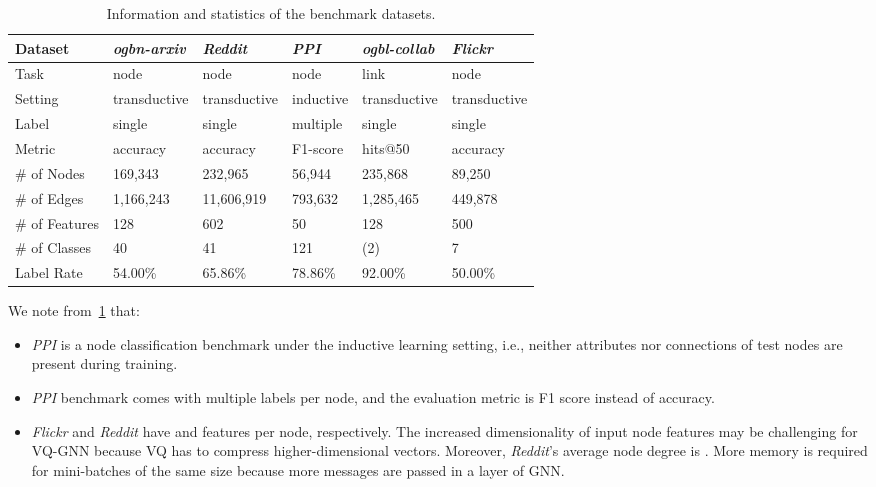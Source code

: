 \documentclass{article}
\begin{document}
\begin{table}[ht]
\centering
\caption{\label{tab:dataset-stats}Information and statistics of the benchmark datasets.}
\begin{tabular}{llllll} \toprule
Dataset        & \textit{ogbn-arxiv}   & \textit{Reddit}       & \textit{PPI}       & \textit{ogbl-collab}  & \textit{Flickr}       \\ \midrule
Task           & node         & node         & node      & link         & node         \\
Setting        & transductive & transductive & inductive & transductive & transductive \\
Label          & single       & single       & multiple  & single       & single       \\
Metric         & accuracy     & accuracy     & F1-score  & hits@50      & accuracy       \\
\# of Nodes    & 169,343      & 232,965      & 56,944    & 235,868      & 89,250       \\
\# of Edges    & 1,166,243    & 11,606,919   & 793,632   & 1,285,465    & 449,878      \\
\# of Features & 128          & 602          & 50        & 128          & 500          \\
\# of Classes  & 40           & 41           & 121       & (2)          & 7            \\
Label Rate     & 54.00\%      & 65.86\%      & 78.86\%   & 92.00\%      & 50.00\%      \\ \bottomrule
\end{tabular}
\end{table}

We note from~\cref{tab:dataset-stats} that: 
\begin{itemize}[leftmargin=*, topsep=1.5pt]
\setlength\itemsep{0.75pt}
    \item \textit{PPI} is a node classification benchmark under the inductive learning setting, i.e., neither attributes nor connections of test nodes are present during training.
    \item \textit{PPI} benchmark comes with multiple labels per node, and the evaluation metric is F1 score instead of accuracy.
    \item \textit{Flickr} and \textit{Reddit} have  and  features per node, respectively. The increased dimensionality of input node features may be challenging for VQ-GNN because VQ has to compress higher-dimensional vectors. Moreover, \textit{Reddit}'s average node degree is . More memory is required for mini-batches of the same size because more messages are passed in a layer of GNN.
\end{itemize}
\end{document}
